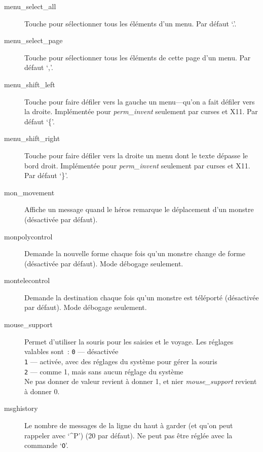 \documentclass[titlepage]{article}
\begin{document}
\begin{description}
\item[{menu\_select\_all}]
Touche pour sélectionner tous les éléments d'un menu.
Par défaut `.'.

\item[{menu\_select\_page}]
Touche pour sélectionner tous les éléments de cette page d'un menu.
Par défaut `,'.

\item[{menu\_shift\_left}]
Touche pour faire défiler vers la gauche un menu---qu'on a fait défiler
vers la droite.
Implémentée pour
\textit{perm\_invent}
seulement par curses et X11.
Par défaut `\{'.

\item[{menu\_shift\_right}]
Touche pour faire défiler vers la droite un menu dont le texte dépasse le
bord droit.
Implémentée pour
\textit{perm\_invent}
seulement par curses et X11.
Par défaut `\}'.

\item[{mon\_movement}]
Affiche un message quand le héros remarque le déplacement d'un monstre
(désactivée par défaut).

\item[{monpolycontrol}]
Demande la nouvelle forme chaque fois qu'un monstre change de forme
(désactivée par défaut).
Mode débogage seulement.

\item[{montelecontrol}]
Demande la destination chaque fois qu'un monstre est téléporté
(désactivée par défaut).
Mode débogage seulement.

\item[{mouse\_support}]
Permet d'utiliser la souris pour les saisies et le voyage.
Les réglages valables sont~:
\texttt{0} --- désactivée\\
\texttt{1} --- activée, avec des réglages du système pour gérer la souris\\
\texttt{2} --- comme 1, mais sans aucun réglage du système\\
Ne pas donner de valeur revient à donner 1, et nier
\textit{mouse\_support}
revient à donner 0.

\item[{msghistory}]
Le nombre de messages de la ligne du haut à garder (et qu'on peut rappeler
avec `\textasciicircum{}P') (20 par défaut).
Ne peut pas être réglée avec la commande `\texttt{O}'.


\end{description}
\end{document}

